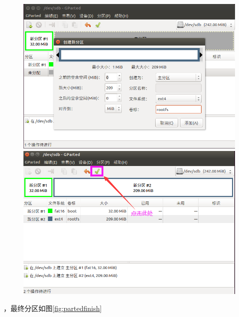 \begin{figure}[htbp]
	\centering
	\begin{minipage}[c]{0.5\textwidth}
	\centering
	\includegraphics[width=0.98\linewidth]{chapter2/img/rootfspartedpng}
	\caption{}
	\label{fig:rootfspartedpng}
	\end{minipage}%
	\begin{minipage}[c]{0.5\textwidth}
	\centering
	\includegraphics[width=0.98\linewidth]{chapter2/img/partedsave}
	\caption{}
	\label{fig:partedsave}
	\end{minipage}
\end{figure}
，最终分区如图\ref{fig:partedfinish}
